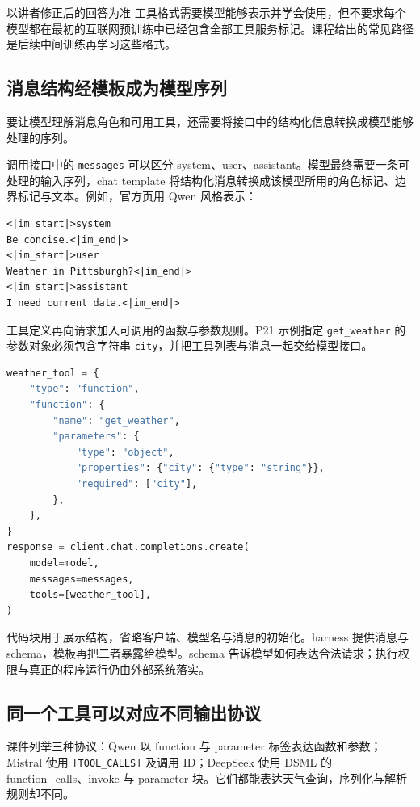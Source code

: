 \documentclass[11pt,a4paper]{article}
\begin{document}
\begin{importantbox}{以讲者修正后的回答为准}
工具格式需要模型能够表示并学会使用，但不要求每个模型都在最初的互联网预训练中已经包含全部工具服务标记。课程给出的常见路径是后续中间训练再学习这些格式。
\end{importantbox}

\subsection{消息结构经模板成为模型序列}
要让模型理解消息角色和可用工具，还需要将接口中的结构化信息转换成模型能够处理的序列。

调用接口中的 \texttt{messages} 可以区分 system、user、assistant。模型最终需要一条可处理的输入序列，chat template 将结构化消息转换成该模型所用的角色标记、边界标记与文本。例如，官方页用 Qwen 风格表示：

\noindent\begin{minipage}{\textwidth}
\begin{lstlisting}[language={},caption={官方 P20 的序列化示意：消息角色经 chat template 进入输入}]
<|im_start|>system
Be concise.<|im_end|>
<|im_start|>user
Weather in Pittsburgh?<|im_end|>
<|im_start|>assistant
I need current data.<|im_end|>
\end{lstlisting}
\end{minipage}

工具定义再向请求加入可调用的函数与参数规则。P21 示例指定 \texttt{get\_weather} 的参数对象必须包含字符串 \texttt{city}，并把工具列表与消息一起交给模型接口。

\noindent\begin{minipage}{\textwidth}
\begin{lstlisting}[language=Python,caption={官方 P21 的工具请求结构：名称、参数 schema 与调用接口}]
weather_tool = {
    "type": "function",
    "function": {
        "name": "get_weather",
        "parameters": {
            "type": "object",
            "properties": {"city": {"type": "string"}},
            "required": ["city"],
        },
    },
}
response = client.chat.completions.create(
    model=model,
    messages=messages,
    tools=[weather_tool],
)
\end{lstlisting}
\end{minipage}

代码块用于展示结构，省略客户端、模型名与消息的初始化。harness 提供消息与 schema，模板再把二者暴露给模型。schema 告诉模型如何表达合法请求；执行权限与真正的程序运行仍由外部系统落实。

\subsection{同一个工具可以对应不同输出协议}
课件列举三种协议：Qwen 以 function 与 parameter 标签表达函数和参数；Mistral 使用 \texttt{[TOOL\_CALLS]} 及调用 ID；DeepSeek 使用 DSML 的 function\_calls、invoke 与 parameter 块。它们都能表达天气查询，序列化与解析规则却不同。
\end{document}
